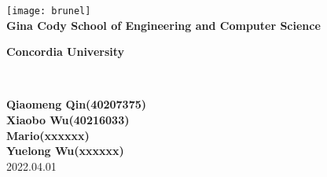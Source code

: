\begin{titlepage}
  \begin{center}
    \texttt{[image: brunel]}\\[1cm]

    \textbf{\large Gina Cody School of Engineering and Computer Science}\\[0.5cm]


    \begin{doublespace}
      \textbf{\LARGE Concordia University}\\[2.75cm]
    \end{doublespace}

    \begin{doublespace}
      \textbf{\LARGE \Title}\\[2.75cm]
    \end{doublespace}

    \textbf{\large Qiaomeng Qin(40207375)}\\[0.5cm]
    \textbf{\large Xiaobo Wu(40216033)}\\[0.5cm]
    \textbf{\large Mario(xxxxxx)}\\[0.5cm]
    \textbf{\large Yuelong Wu(xxxxxx)}\\[0.5cm]

    \vfill
    \textsc{\footnotesize{2022.04.01}}\\

  \end{center}


\end{titlepage}
